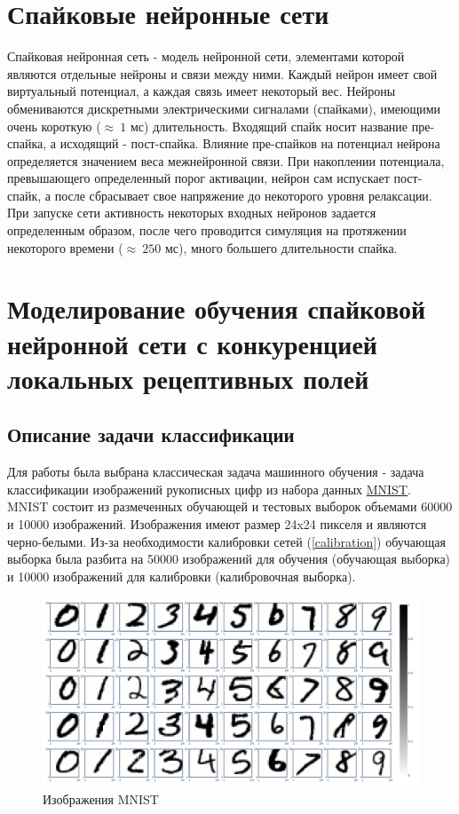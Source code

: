 \documentclass[a4paper]{article}
\begin{document}
\section{Спайковые нейронные сети}
Спайковая нейронная сеть \cite{LOBO202088} - модель нейронной сети, элементами которой являются  отдельные нейроны и связи между ними. Каждый нейрон имеет свой виртуальный потенциал, а каждая связь имеет некоторый вес. Нейроны обмениваются дискретными электрическими сигналами (спайками), имеющими очень короткую ($ \approx ~1$ мс) длительность. Входящий спайк носит название пре-спайка, а исходящий - пост-спайка.  Влияние пре-спайков на потенциал нейрона определяется значением веса межнейронной связи. При накоплении потенциала, превышающего определенный порог активации, нейрон сам испускает пост-спайк, а после сбрасывает свое напряжение до некоторого уровня релаксации. При запуске сети активность некоторых входных нейронов задается определенным образом, после чего проводится симуляция на протяжении некоторого времени ($\approx ~250$ мс), много большего длительности спайка.

\section{Моделирование обучения спайковой нейронной сети с конкуренцией локальных рецептивных полей}

\subsection{Описание задачи классификации} 
Для работы была выбрана классическая задача машинного обучения - задача классификации изображений рукописных цифр из набора данных \href{http://www.pymvpa.org/datadb/mnist.html}{MNIST}. MNIST состоит из размеченных обучающей и тестовых выборок объемами 60000 и 10000 изображений. Изображения имеют размер 24x24 пикселя и являются черно-белыми. Из-за необходимости калибровки сетей (\ref{calibration}) обучающая выборка была разбита на 50000 изображений для обучения (обучающая выборка) и 10000 изображений для калибровки (калибровочная выборка).


\begin{figure} \label{MNIST} 
 \includegraphics[width=.45\textwidth,keepaspectratio=true]{MNIST.pdf} 
 
 \caption{Изображения MNIST}
\end{figure}
\end{document}
